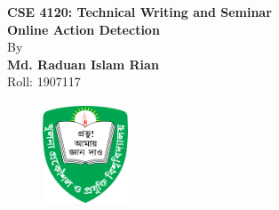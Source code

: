 \documentclass[12pt]{article}
\begin{document}
\begin{titlepage}
    \begin{center}
    \setcounter{page}{0} %
    {\fontsize{14}{1.5}\selectfont \textbf{CSE 4120: Technical Writing and Seminar}}\\
    \vspace{12pt}
    {\fontsize{18}{1.5}\selectfont \textbf{Online Action Detection}}\\

    \vspace{12pt}
    \vspace{12pt}
    {\fontsize{14}{1.5}\selectfont By}\\
    \vspace{12pt}
    \vspace{12pt}
    \vspace{12pt}
    {\fontsize{14}{1.5}\selectfont \textbf{Md. Raduan Islam Rian}}\\
    \vspace{12pt}
    {\fontsize{14}{1.5}\selectfont Roll: 1907117}\\
    \vspace{12pt}
    \vspace{12pt}
    \vspace{12pt}
    \vspace{12pt}
    \vspace{12pt}
    \vspace{12pt}
    \vspace{12pt}
    \vspace{12pt}
    \begin{figure}[htp!]
        \centering
        \includegraphics[height=1.2in, width=1in]{img/Logo_KUET.svg.png}
    \end{figure}
    \vspace{12pt}
    \vspace{12pt}
    \vspace{12pt}

\end{center}
\end{titlepage}
\end{document}
